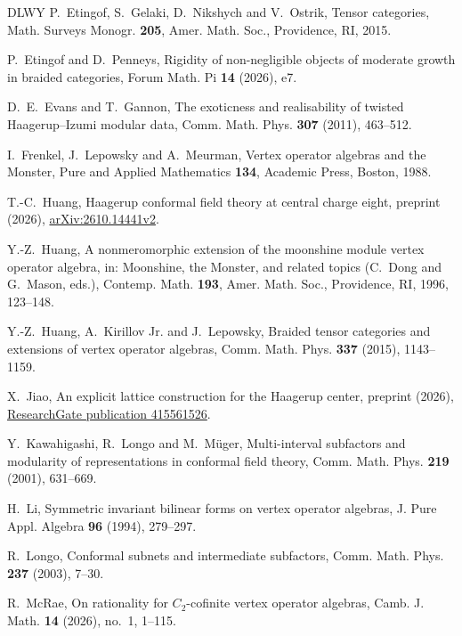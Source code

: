 \documentclass[11pt,reqno]{amsart}
\theoremstyle{definition}\newtheorem{definition}[theorem]{Definition}
\theoremstyle{remark}\newtheorem{remark}[theorem]{Remark}
\numberwithin{equation}{section}
\begin{document}
\begin{thebibliography}{DLWY}
 P.~Etingof, S.~Gelaki, D.~Nikshych and V.~Ostrik, Tensor categories, Math. Surveys Monogr. \textbf{205}, Amer. Math. Soc., Providence, RI, 2015.

 P.~Etingof and D.~Penneys, Rigidity of non-negligible objects of moderate growth in braided categories, Forum Math. Pi \textbf{14} (2026), e7.

 D.~E.~Evans and T.~Gannon, The exoticness and realisability of twisted Haagerup--Izumi modular data, Comm. Math. Phys. \textbf{307} (2011), 463--512.

 I.~Frenkel, J.~Lepowsky and A.~Meurman, Vertex operator algebras and the Monster, Pure and Applied Mathematics \textbf{134}, Academic Press, Boston, 1988.

 T.-C.~Huang, Haagerup conformal field theory at central charge eight, preprint (2026), \href{https://arxiv.org/abs/2610.14441v2}{arXiv:2610.14441v2}.

 Y.-Z.~Huang, A nonmeromorphic extension of the moonshine module vertex operator algebra, in: Moonshine, the Monster, and related topics (C.~Dong and G.~Mason, eds.), Contemp. Math. \textbf{193}, Amer. Math. Soc., Providence, RI, 1996, 123--148.

 Y.-Z.~Huang, A.~Kirillov Jr. and J.~Lepowsky, Braided tensor categories and extensions of vertex operator algebras, Comm. Math. Phys. \textbf{337} (2015), 1143--1159.

 X.~Jiao, An explicit lattice construction for the Haagerup center, preprint (2026), \href{https://www.researchgate.net/publication/415561526_An_explicit_lattice_construction_for_the_Haagerup_center}{ResearchGate publication 415561526}.

 Y.~Kawahigashi, R.~Longo and M.~M\"uger, Multi-interval subfactors and modularity of representations in conformal field theory, Comm. Math. Phys. \textbf{219} (2001), 631--669.

 H.~Li, Symmetric invariant bilinear forms on vertex operator algebras, J. Pure Appl. Algebra \textbf{96} (1994), 279--297.

 R.~Longo, Conformal subnets and intermediate subfactors, Comm. Math. Phys. \textbf{237} (2003), 7--30.

 R.~McRae, On rationality for $C_2$-cofinite vertex operator algebras, Camb. J. Math. \textbf{14} (2026), no.~1, 1--115.


\end{thebibliography}
\end{document}

